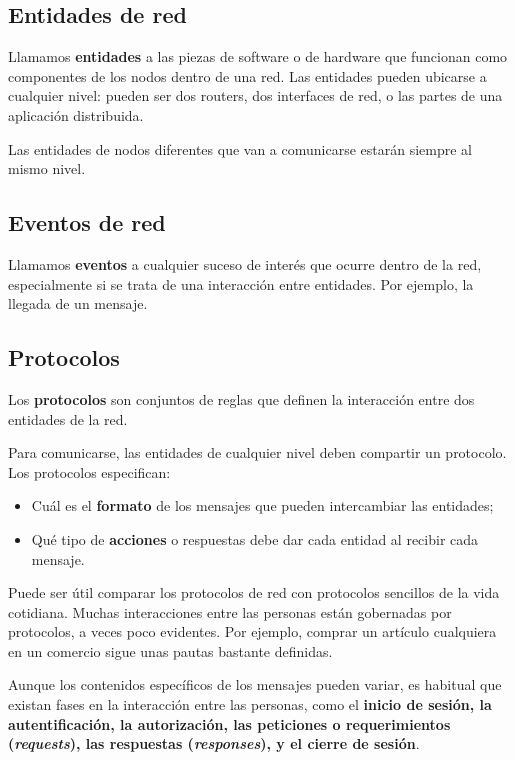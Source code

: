 \documentclass[spanish,a4paper,]{article}
\providecommand{\tightlist}{%
  \setlength{\itemsep}{0pt}\setlength{\parskip}{0pt}}
\begin{document}
\hypertarget{entidades-de-red}{%
\subsection{Entidades de red}\label{entidades-de-red}}

Llamamos \textbf{entidades} a las piezas de software o de hardware que
funcionan como componentes de los nodos dentro de una red. Las entidades
pueden ubicarse a cualquier nivel: pueden ser dos routers, dos
interfaces de red, o las partes de una aplicación distribuida.

Las entidades de nodos diferentes que van a comunicarse estarán siempre
al mismo nivel.

\hypertarget{eventos-de-red}{%
\subsection{Eventos de red}\label{eventos-de-red}}

Llamamos \textbf{eventos} a cualquier suceso de interés que ocurre
dentro de la red, especialmente si se trata de una interacción entre
entidades. Por ejemplo, la llegada de un mensaje.

\hypertarget{protocolos}{%
\subsection{Protocolos}\label{protocolos}}

Los \textbf{protocolos} son conjuntos de reglas que definen la
interacción entre dos entidades de la red.

Para comunicarse, las entidades de cualquier nivel deben compartir un
protocolo. Los protocolos especifican:

\begin{itemize}
\tightlist
\item
  Cuál es el \textbf{formato} de los mensajes que pueden intercambiar
  las entidades;
\item
  Qué tipo de \textbf{acciones} o respuestas debe dar cada entidad al
  recibir cada mensaje.
\end{itemize}

Puede ser útil comparar los protocolos de red con protocolos sencillos
de la vida cotidiana. Muchas interacciones entre las personas están
gobernadas por protocolos, a veces poco evidentes. Por ejemplo, comprar
un artículo cualquiera en un comercio sigue unas pautas bastante
definidas.

Aunque los contenidos específicos de los mensajes pueden variar, es
habitual que existan fases en la interacción entre las personas, como el
\textbf{inicio de sesión, la autentificación, la autorización, las
peticiones o requerimientos (\emph{requests}), las respuestas
(\emph{responses}), y el cierre de sesión}.
\end{document}
